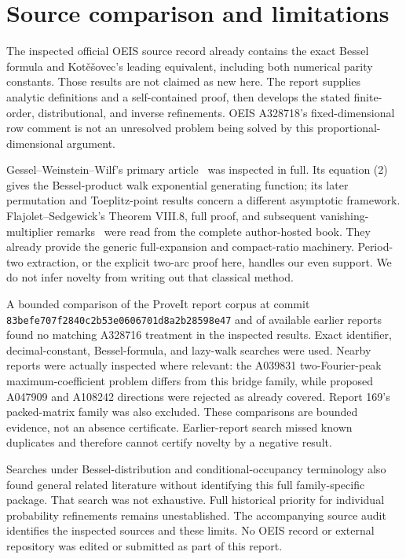 \documentclass[11pt,letterpaper]{article}
\theoremstyle{remark}\newtheorem{remark}[theorem]{Remark}
\begin{document}
\section{Source comparison and limitations}\label{lcw:sec:sources}
The inspected official OEIS source record already contains the exact Bessel formula and Kot\v e\v sovec's leading equivalent, including both numerical parity constants. Those results are not claimed as new here. The report supplies analytic definitions and a self-contained proof, then develops the stated finite-order, distributional, and inverse refinements. OEIS A328718's fixed-dimensional row comment is not an unresolved problem being solved by this proportional-dimensional argument.

Gessel--Weinstein--Wilf's primary article~\cite{gww} was inspected in full. Its equation (2) gives the Bessel-product walk exponential generating function; its later permutation and Toeplitz-point results concern a different asymptotic framework. Flajolet--Sedgewick's Theorem VIII.8, full proof, and subsequent vanishing-multiplier remarks~\cite{fs} were read from the complete author-hosted book. They already provide the generic full-expansion and compact-ratio machinery. Period-two extraction, or the explicit two-arc proof here, handles our even support. We do not infer novelty from writing out that classical method.

A bounded comparison of the ProveIt report corpus at commit
\texttt{83befe707f2840c2b53e}\allowbreak\texttt{0606701d8a2b28598e47}
and of available earlier reports found no matching A328716 treatment in the inspected results. Exact identifier, decimal-constant, Bessel-formula, and lazy-walk searches were used. Nearby reports were actually inspected where relevant: the A039831 two-Fourier-peak maximum-coefficient problem differs from this bridge family, while proposed A047909 and A108242 directions were rejected as already covered. Report 169's packed-matrix family was also excluded. These comparisons are bounded evidence, not an absence certificate. Earlier-report search missed known duplicates and therefore cannot certify novelty by a negative result.

Searches under Bessel-distribution and conditional-occupancy terminology also found general related literature without identifying this full family-specific package. That search was not exhaustive. Full historical priority for individual probability refinements remains unestablished. The accompanying source audit identifies the inspected sources and these limits. No OEIS record or external repository was edited or submitted as part of this report.
\end{document}
